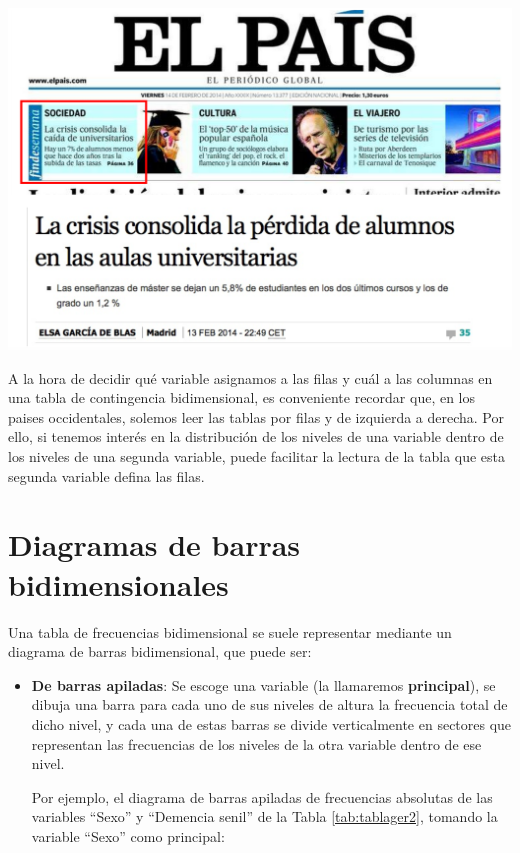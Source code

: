 \documentclass[
]{book}
\theoremstyle{definition}
\theoremstyle{definition}
\theoremstyle{definition}
\theoremstyle{definition}
\theoremstyle{remark}
\begin{document}
\begin{center}\includegraphics[width=0.75\linewidth]{INREMDN_files/figure-html/elpais} \end{center}

\begin{rmdnote}
A la hora de decidir qué variable asignamos a las filas y cuál a las columnas en una tabla de contingencia bidimensional, es conveniente recordar que, en los paises occidentales, solemos leer las tablas por filas y de izquierda a derecha. Por ello, si tenemos interés en la distribución de los niveles de una variable dentro de los niveles de una segunda variable, puede facilitar la lectura de la tabla que esta segunda variable defina las filas.
\end{rmdnote}

\hypertarget{sec:barrasbidim}{%
\section{Diagramas de barras bidimensionales}\label{sec:barrasbidim}}

Una tabla de frecuencias bidimensional se suele representar mediante un diagrama de barras bidimensional, que puede ser:

\begin{itemize}
\item
  \textbf{De barras apiladas}: Se escoge una variable (la llamaremos \textbf{principal}), se dibuja una barra para cada uno de sus niveles de altura la frecuencia total de dicho nivel, y cada una de estas barras se divide verticalmente en sectores que representan las frecuencias de los niveles de la otra variable dentro de ese nivel.

  Por ejemplo, el diagrama de barras apiladas de frecuencias absolutas de las variables ``Sexo'' y ``Demencia senil'' de la Tabla \ref{tab:tablager2}, tomando la variable ``Sexo'' como principal:
\end{itemize}
\end{document}
